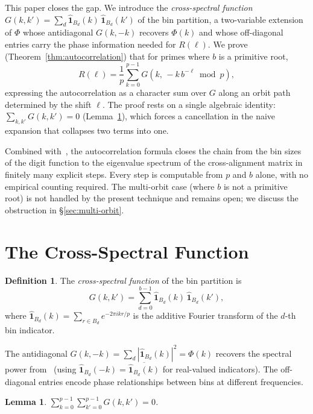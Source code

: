 \documentclass[12pt]{amsart}
\newtheorem{lemma}[theorem]{Lemma}
\theoremstyle{definition}
\newtheorem{definition}[theorem]{Definition}
\theoremstyle{remark}
\begin{document}
This paper closes the gap. We introduce the
\emph{cross-spectral function} $G(k, k') = \sum_d
\widehat{\mathbf{1}}_{B_d}(k)\, \widehat{\mathbf{1}}_{B_d}(k')$
of the bin partition, a two-variable extension of $\Phi$
whose antidiagonal $G(k, -k)$ recovers $\Phi(k)$ and whose
off-diagonal entries carry the phase information needed
for $R(\ell)$. We prove (Theorem~\ref{thm:autocorrelation})
that for primes where $b$ is a primitive root,
\[
R(\ell) = \frac{1}{p} \sum_{k=0}^{p-1} G\!\left(k,\,
-k\, b^{-\ell} \bmod p\right),
\]
expressing the autocorrelation as a character sum over
$G$ along an orbit path determined by the shift $\ell$.
The proof rests on a single algebraic identity:
$\sum_{k, k'} G(k, k') = 0$ (Lemma~\ref{lem:G-sum-zero}),
which forces a cancellation in the naive expansion that
collapses two terms into one.

Combined with~\cite{paper3,paper7,paper8}, the autocorrelation
formula closes the chain from the bin sizes of the digit
function to the eigenvalue spectrum of the cross-alignment
matrix in finitely many explicit steps. Every step is
computable from $p$ and $b$ alone, with no empirical
counting required. The multi-orbit case (where $b$ is not
a primitive root) is not handled by the present technique
and remains open; we discuss the obstruction in
\S\ref{sec:multi-orbit}.

\section{The Cross-Spectral Function}

\begin{definition}
The \emph{cross-spectral function} of the bin partition is
\[
G(k,k') = \sum_{d=0}^{b-1}
\widehat{\mathbf{1}}_{B_d}(k)\,
\widehat{\mathbf{1}}_{B_d}(k'),
\]
where $\widehat{\mathbf{1}}_{B_d}(k) = \sum_{r \in B_d}
e^{-2\pi i kr/p}$ is the additive Fourier transform of the $d$-th
bin indicator.
\end{definition}

The antidiagonal $G(k,-k) = \sum_d |\widehat{\mathbf{1}}_{B_d}(k)|^2
= \Phi(k)$ recovers the spectral power from~\cite{paper8}
(using $\widehat{\mathbf{1}}_{B_d}(-k) = \overline{\widehat{\mathbf{1}}_{B_d}(k)}$
for real-valued indicators). The
off-diagonal entries encode phase relationships between bins at
different frequencies.

\begin{lemma}\label{lem:G-sum-zero}
$\sum_{k=0}^{p-1} \sum_{k'=0}^{p-1} G(k,k') = 0$.
\end{lemma}
\end{document}
